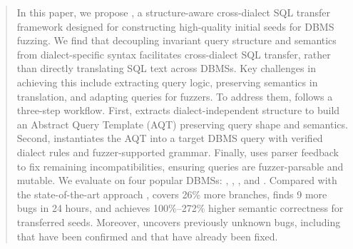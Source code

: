 \documentclass[sigconf,review,anonymous]{acmart}
\begin{document}
\begin{abstract}
In this paper, we propose \tool{}, a structure-aware cross-dialect SQL transfer framework designed for constructing high-quality initial seeds for DBMS fuzzing. 
We find that decoupling invariant query structure and semantics from dialect-specific syntax facilitates cross-dialect SQL transfer, rather than directly translating SQL text across DBMSs.
Key challenges in achieving this include extracting query logic, preserving semantics in translation, and adapting queries for fuzzers.
To address them, \tool{} follows a three-step workflow.
First, \tool{} extracts dialect-independent structure to build an Abstract Query Template (AQT) preserving query shape and semantics.
Second, \tool{} instantiates the AQT into a target DBMS query with verified dialect rules and fuzzer-supported grammar.
Finally, \tool{} uses parser feedback to fix remaining incompatibilities, ensuring queries are fuzzer-parsable and mutable.
We evaluate \tool{} on four popular DBMSs: \duckdb{}, \clickhouse{}, \monetdb{}, and \virtuoso{}. 
Compared with the state-of-the-art approach \sedar{}, \tool{} covers 26\% more branches, finds 9 more bugs in 24 hours, and achieves 100\%–272\% higher semantic correctness for transferred seeds.
Moreover, \tool{} uncovers \bugcnt{} previously unknown bugs, including \bugconfirmcnt{} that have been confirmed and \bugfixcnt{} that have already been fixed.





\end{abstract}
\end{document}
